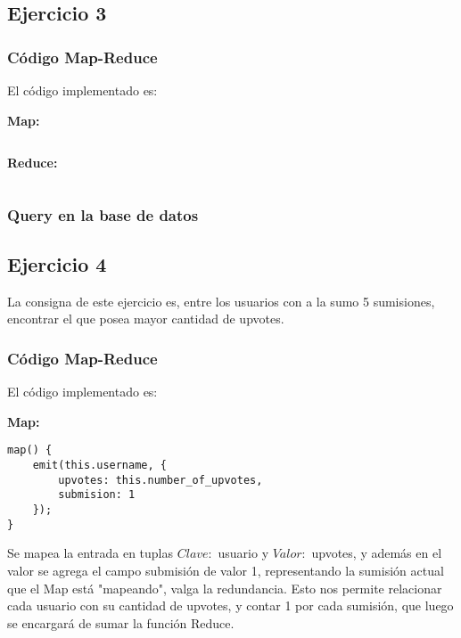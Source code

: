 \subsection{Ejercicio 3}

\subsubsection{C\'odigo Map-Reduce}

El c\'odigo implementado es:

\textbf{Map:}

\begin{lstlisting}

\end{lstlisting}


\vspace{2mm}

\textbf{Reduce:}

\begin{lstlisting}

\end{lstlisting}


\vspace{2mm}

\subsubsection{Query en la base de datos}


\subsection{Ejercicio 4}

La consigna de este ejercicio es, entre los usuarios con a la sumo 5 sumisiones, encontrar el que posea mayor cantidad de
upvotes.

\subsubsection{C\'odigo Map-Reduce}

El c\'odigo implementado es:

\textbf{Map:}

\begin{lstlisting}
map() {
    emit(this.username, {
    	upvotes: this.number_of_upvotes,
    	submision: 1
    });
}
\end{lstlisting}

Se mapea la entrada en tuplas $Clave:$ usuario y $Valor:$ upvotes, y adem\'as en el valor se agrega el campo submisi\'on de valor 1, representando la sumisi\'on actual que el Map est\'a "mapeando", valga la redundancia. Esto nos permite relacionar cada usuario con su cantidad de upvotes, y contar 1 por cada sumisi\'on, que luego se encargar\'a de sumar la funci\'on Reduce.



